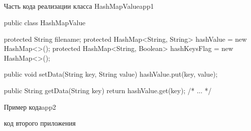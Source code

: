 \documentclass[a4paper,12pt]{article}
\begin{document}
\pagebreak

\renewcommand{\appendixpagename}{\centering Приложения}

\begin{appendices}
\renewcommand{\thesection}{\Asbuk{section}}
\makeatletter
\renewcommand{\theProgram}{\thesection.\@arabic\c@Program}
\makeatother

\section{\centering } 
\setcounter{Program}{0}

\begin{MyList}{Часть кода реализации класса HashMapValue}{app1}
\begin{MyCodes}
public class HashMapValue {
	
	protected String filename; 
	protected HashMap<String, String> hashValue = 
	new HashMap<>();
	protected HashMap<String, Boolean> hashKeysFlag =
	 new HashMap<>();
	
	public void setData(String key, String value) {
		hashValue.put(key, value);
	}
	
	public String getData(String key) {
		return hashValue.get(key);
	}
    /* ... */
}
\end{MyCodes}
\end{MyList}

\pagebreak

\begin{MyList}{Пример кода}{app2}
\begin{MyCodes}
код второго приложения
\end{MyCodes}

\end{MyList}

\end{appendices}
\end{document}
